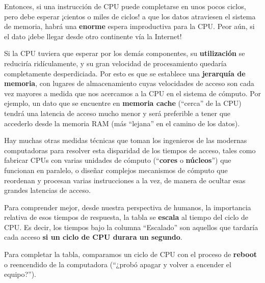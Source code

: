 \documentclass[spanish,A4,]{article}
\begin{document}
Entonces, si una instrucción de CPU puede completarse en unos pocos
ciclos, pero debe esperar ¡cientos o miles de ciclos! a que los datos
atraviesen el sistema de memoria, habrá una \textbf{enorme} espera
improductiva para la CPU. Peor aún, si el dato ¡debe llegar desde otro
continente vía la Internet!

Si la CPU tuviera que esperar por los demás componentes, su
\textbf{utilización} se reduciría ridículamente, y su gran velocidad de
procesamiento quedaría completamente desperdiciada. Por esto es que se
establece una \textbf{jerarquía de memoria}, con lugares de
almacenamiento cuyas velocidades de acceso son cada vez mayores a medida
que nos acercamos a la CPU en el sistema de cómputo. Por ejemplo, un
dato que se encuentre en \textbf{memoria cache} (``cerca'' de la CPU)
tendrá una latencia de acceso mucho menor y será preferible a tener que
accederlo desde la memoria RAM (más ``lejana'' en el camino de los
datos).

Hay muchas otras medidas técnicas que toman los ingenieros de las
modernas computadoras para resolver esta disparidad de los tiempos de
acceso, tales como fabricar CPUs con varias unidades de cómputo
(``\textbf{cores} o \textbf{núcleos}'') que funcionan en paralelo, o
diseñar complejos mecanismos de cómputo que reordenan y procesan varias
instrucciones a la vez, de manera de ocultar esas grandes latencias de
acceso.

Para comprender mejor, desde nuestra perspectiva de humanos, la
importancia relativa de esos tiempos de respuesta, la tabla se
\textbf{escala} al tiempo del ciclo de CPU. Es decir, los tiempos bajo
la columna ``Escalado'' son aquellos que tardaría cada acceso \textbf{si
un ciclo de CPU durara un segundo}.

Para completar la tabla, comparamos un ciclo de CPU con el proceso de
\textbf{reboot} o reencendido de la computadora (``¿probó apagar y
volver a encender el equipo?'').
\end{document}

